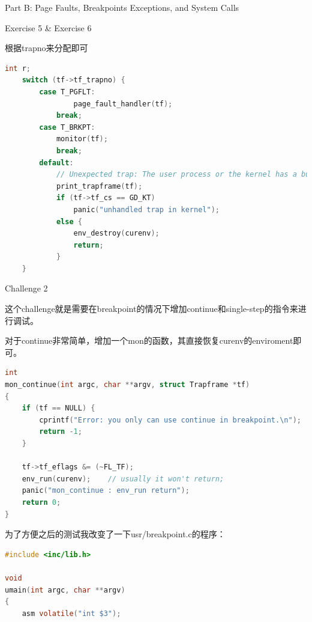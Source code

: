 \documentclass[GBK,winfonts,a4paper,10pt]{ctexart}
\begin{document}
\begin{section}{ Part B: Page Faults, Breakpoints Exceptions, and System Calls }
\begin{subsection}{ Exercise 5 \& Exercise 6}
\par
根据trapno来分配即可
\begin{lstlisting}[language=C]
    int r;
    switch (tf->tf_trapno) {
        case T_PGFLT:
        		page_fault_handler(tf);
            break;
        case T_BRKPT:
            monitor(tf); 
            break;
        default:
	        // Unexpected trap: The user process or the kernel has a bug.
	        print_trapframe(tf);
	        if (tf->tf_cs == GD_KT)
		        panic("unhandled trap in kernel");
	        else {
		        env_destroy(curenv);
		        return;
	        }
    }
\end{lstlisting}
\end{subsection}

\begin{subsection}{ Challenge 2 }
\par
这个challenge就是需要在breakpoint的情况下增加continue和single-step的指令来进行调试。
\par
对于continue非常简单，增加一个mon的函数，其直接恢复curenv的enviroment即可。
\par
\begin{lstlisting}[language=C]
int 
mon_continue(int argc, char **argv, struct Trapframe *tf)
{
    if (tf == NULL) {
        cprintf("Error: you only can use continue in breakpoint.\n");
        return -1;
    }
    
    tf->tf_eflags &= (~FL_TF);
    env_run(curenv);    // usually it won't return;
    panic("mon_continue : env_run return");
    return 0;
}
\end{lstlisting}
\par
为了方便之后的测试我改变了一下usr/breakpoint.c的程序：
\par
\begin{lstlisting}[language=C]
#include <inc/lib.h>

void
umain(int argc, char **argv)
{
	asm volatile("int $3");


\end{lstlisting}
\end{subsection}
\end{section}
\end{document}
